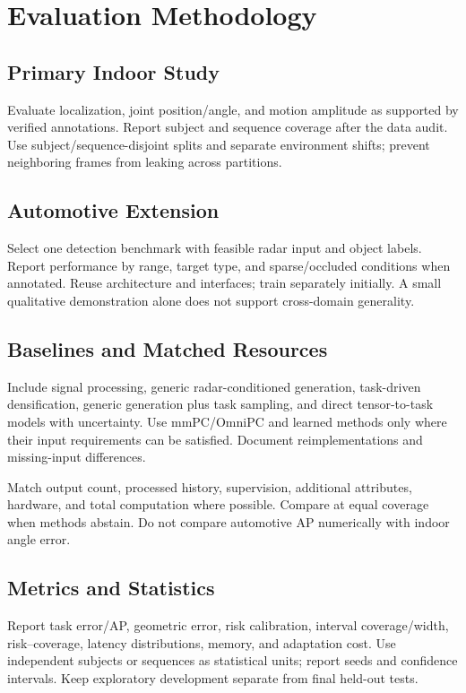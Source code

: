 \section{Evaluation Methodology}
\label{sec:methodology}
\subsection{Primary Indoor Study}
Evaluate localization, joint position/angle, and motion amplitude as supported by verified annotations. Report subject and sequence coverage after the data audit. Use subject/sequence-disjoint splits and separate environment shifts; prevent neighboring frames from leaking across partitions.

\subsection{Automotive Extension}
Select one detection benchmark with feasible radar input and object labels. Report performance by range, target type, and sparse/occluded conditions when annotated. Reuse architecture and interfaces; train separately initially. A small qualitative demonstration alone does not support cross-domain generality.

\subsection{Baselines and Matched Resources}
Include signal processing, generic radar-conditioned generation, task-driven densification, generic generation plus task sampling, and direct tensor-to-task models with uncertainty. Use mmPC/OmniPC and learned methods only where their input requirements can be satisfied. Document reimplementations and missing-input differences.

Match output count, processed history, supervision, additional attributes, hardware, and total computation where possible. Compare at equal coverage when methods abstain. Do not compare automotive AP numerically with indoor angle error.

\subsection{Metrics and Statistics}
Report task error/AP, geometric error, risk calibration, interval coverage/width, risk--coverage, latency distributions, memory, and adaptation cost. Use independent subjects or sequences as statistical units; report seeds and confidence intervals. Keep exploratory development separate from final held-out tests.
